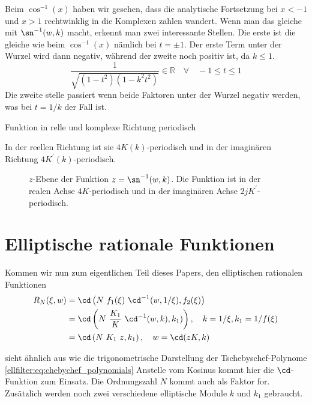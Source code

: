\begin{refsection}
Beim $\cos^{-1}(x)$ haben wir gesehen, dass die analytische Fortsetzung bei $x < -1$ und $x > 1$ rechtwinklig in die Komplexen zahlen wandert.
Wenn man das gleiche mit $\sn^{-1}(w, k)$ macht, erkennt man zwei interessante Stellen.
Die erste ist die gleiche wie beim $\cos^{-1}(x)$ nämlich bei $t = \pm 1$.
Der erste Term unter der Wurzel wird dann negativ, während der zweite noch positiv ist, da $k \leq 1$.
\begin{equation}
    \frac{
        1
    }{
        \sqrt{
            (1-t^2)(1-k^2 t^2)
        }
    }
    \in \mathbb{R}
    \quad \forall \quad
    -1 \leq t \leq 1
\end{equation}
Die zweite stelle passiert wenn beide Faktoren unter der Wurzel negativ werden, was bei $t = 1/k$ der Fall ist.




Funktion in relle und komplexe Richtung periodisch

In der reellen Richtung ist sie $4K(k)$-periodisch und in der imaginären Richtung $4K^\prime(k)$-periodisch.




\begin{figure}
    \centering
    
    \caption{
        $z$-Ebene der Funktion $z = \sn^{-1}(w, k)$.
        Die Funktion ist in der realen Achse $4K$-periodisch und in der imaginären Achse $2jK^\prime$-periodisch.
    }
\end{figure}

\section{Elliptische rationale Funktionen}

Kommen wir nun zum eigentlichen Teil dieses Papers, den elliptischen rationalen Funktionen
\begin{align}
    R_N(\xi, w) &= \cd \left(N~f_1(\xi)~\cd^{-1}(w, 1/\xi), f_2(\xi)\right) \\
                &= \cd \left(N~\frac{K_1}{K}~\cd^{-1}(w, k), k_1)\right) , \quad k= 1/\xi, k_1 = 1/f(\xi) \\
                &= \cd \left(N~K_1~z , k_1 \right), \quad w= \cd(z K, k)
\end{align}


sieht ähnlich aus wie die trigonometrische Darstellung der Tschebyschef-Polynome \eqref{ellfilter:eq:chebychef_polynomials}
Anstelle vom Kosinus kommt hier die $\cd$-Funktion zum Einsatz.
Die Ordnungszahl $N$ kommt auch als Faktor for.
Zusätzlich werden noch zwei verschiedene elliptische Module $k$ und $k_1$ gebraucht.




\end{refsection}
